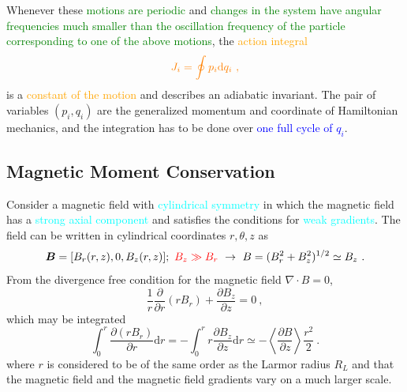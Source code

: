 \documentclass[12pt,a4paper]{article}
\renewcommand{\vec}[1]{\boldsymbol{#1}}
\newcommand{\dif}{\mathrm{d}}
\begin{document}
Whenever these \textcolor{green}{motions are periodic} and \textcolor{green}{changes in the system have angular frequencies much smaller than the oscillation frequency of the particle corresponding to one of the above motions}, the \textcolor{orange}{action integral}
\begin{equation}
\color{orange} J_i = \oint p_i \dif q_i ~,
\end{equation}
is a \textcolor{orange}{constant of the motion} and describes an adiabatic invariant. The pair of variables $(p_i ,q_i)$ are the generalized momentum and coordinate of Hamiltonian mechanics, and the integration has to be done over  \textcolor{blue}{one full cycle of $q_i$}.

\subsection{Magnetic Moment Conservation}
\cite{2015bps..book.....C} Consider a magnetic field with \textcolor{cyan}{cylindrical symmetry} in which the magnetic field has a \textcolor{cyan}{strong axial component} and  satisfies the conditions for \textcolor{cyan}{weak gradients}. The field can be written in cylindrical coordinates $r, \theta, z$ as
\begin{equation*}
\vec{B} = [B_r(r,z), 0, B_z(r,z)] ; ~\textcolor{red}{B_z \gg B_r} ~\rightarrow ~ B = (B_r^2 +B_z^2)^{1/2} \simeq B_z ~.
\end{equation*}
From the divergence free condition for the magnetic field $\nabla \cdot B = 0$,
\begin{equation*}
\frac{1}{r} \frac{\partial}{\partial r}(r B_r) +\frac{\partial B_z}{\partial z} = 0 ~,
\end{equation*}
which may be integrated
\begin{equation*}
\int_0^r \frac{\partial (r B_r)}{\partial r} \dif r = -\int_0^r r \frac{\partial B_z}{\partial z} \dif r \simeq -\left\langle \frac{\partial B}{\partial z} \right\rangle \frac{r^2}{2} ~.
\end{equation*}
where $r$ is considered to be of the same order as the Larmor radius $R_L$ and that the magnetic field and the magnetic field gradients vary on a much larger scale. 
\end{document}
